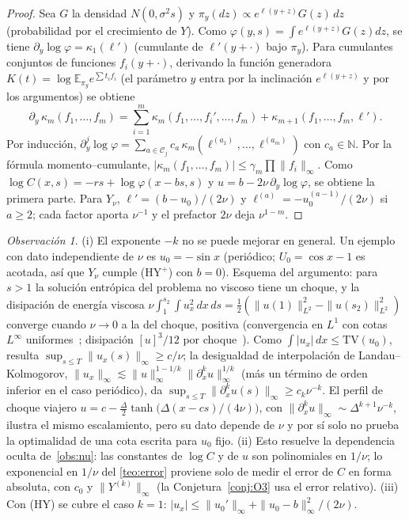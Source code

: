 \documentclass[11pt,letterpaper]{article}
\theoremstyle{plain}
\theoremstyle{definition}
\theoremstyle{remark}
\newtheorem{observacion}[theorem]{Observación}
\numberwithin{equation}{section}
\newcommand{\E}{\mathbb{E}}
\begin{document}
	\begin{proof}
		Sea \(G\) la densidad \(N(0,\sigma^2s)\) y \(\pi_y(dz)\propto e^{\ell(y+z)}G(z)\,dz\) (probabilidad por el crecimiento de \(Y\)). Como \(\varphi(y,s)=\int e^{\ell(y+z)}G(z)dz\), se tiene \(\partial_y\log\varphi=\kappa_1(\ell')\) (cumulante de \(\ell'(y+\cdot)\) bajo \(\pi_y\)). Para cumulantes conjuntos de funciones \(f_i(y+\cdot)\), derivando la función generadora \(K(t)=\log\E_{\pi_y}e^{\sum t_if_i}\) (el parámetro \(y\) entra por la inclinación \(e^{\ell(y+z)}\) y por los argumentos) se obtiene
		\[
		\partial_y\,\kappa_m(f_1,\dots,f_m)=\sum_{i=1}^m\kappa_m(f_1,\dots,f_i',\dots,f_m)+\kappa_{m+1}(f_1,\dots,f_m,\ell').
		\]
		Por inducción, \(\partial_y^j\log\varphi=\sum_{a\in\mathcal C_j}c_a\,\kappa_m(\ell^{(a_1)},\dots,\ell^{(a_m)})\) con \(c_a\in\mathbb N\). Por la fórmula momento--cumulante, \(|\kappa_m(f_1,\dots,f_m)|\le\gamma_m\prod\|f_i\|_\infty\). Como \(\log C(x,s)=-rs+\log\varphi(x-bs,s)\) y \(u=b-2\nu\,\partial_y\log\varphi\), se obtiene la primera parte. Para \(Y_\nu\), \(\ell'=(b-u_0)/(2\nu)\) y \(\ell^{(a)}=-u_0^{(a-1)}/(2\nu)\) si \(a\ge2\); cada factor aporta \(\nu^{-1}\) y el prefactor \(2\nu\) deja \(\nu^{1-m}\).
	\end{proof}
	
	\begin{observacion}
		(i) El exponente \(-k\) no se puede mejorar en general. Un ejemplo con dato independiente de \(\nu\) es \(u_0=-\sin x\) (periódico; \(U_0=\cos x-1\) es acotada, así que \(Y_\nu\) cumple (HY\(^+\)) con \(b=0\)). Esquema del argumento: para \(s>1\) la solución entrópica del problema no viscoso tiene un choque, y la disipación de energía viscosa \(\nu\int_1^{s_2}\!\!\int u_x^2\,dx\,ds=\frac12(\|u(1)\|_{L^2}^2-\|u(s_2)\|_{L^2}^2)\) converge cuando \(\nu\to0\) a la del choque, positiva (convergencia en \(L^1\) con cotas \(L^\infty\) uniformes~\cite{Kruzkov1970}; disipación \([u]^3/12\) por choque~\cite{Dafermos2016}). Como \(\int|u_x|\,dx\le\mathrm{TV}(u_0)\), resulta \(\sup_{s\le T}\|u_x(s)\|_\infty\ge c/\nu\); la desigualdad de interpolación de Landau--Kolmogorov, \(\|u_x\|_\infty\lesssim\|u\|_\infty^{1-1/k}\|\partial_x^ku\|_\infty^{1/k}\) (más un término de orden inferior en el caso periódico), da \(\sup_{s\le T}\|\partial_x^ku(s)\|_\infty\ge c_k\nu^{-k}\). El perfil de choque viajero \(u=c-\frac\Delta2\tanh\bigl(\Delta(x-cs)/(4\nu)\bigr)\), con \(\|\partial_x^ku\|_\infty\sim\Delta^{k+1}\nu^{-k}\), ilustra el mismo escalamiento, pero su dato depende de \(\nu\) y por sí solo no prueba la optimalidad de una cota escrita para \(u_0\) fijo. (ii) Esto resuelve la dependencia oculta de~\cref{obs:nu}: las constantes de \(\log C\) y de \(u\) son polinomiales en \(1/\nu\); lo exponencial en \(1/\nu\) del \cref{teo:error} proviene solo de medir el error de \(C\) en forma absoluta, con \(c_0\) y \(\|Y^{(k)}\|_\infty\) (la Conjetura~\ref{conj:O3} usa el error relativo). (iii) Con (HY) se cubre el caso \(k=1\): \(|u_x|\le\|u_0'\|_\infty+\|u_0-b\|_\infty^2/(2\nu)\).
	\end{observacion}
	
\end{document}
